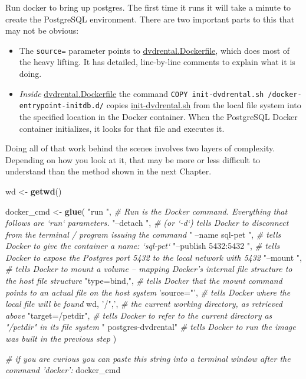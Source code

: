 \documentclass[]{book}
\newenvironment{Shaded}{\begin{snugshade}}{\end{snugshade}}
\newcommand{\CommentTok}[1]{\textcolor[rgb]{0.56,0.35,0.01}{\textit{#1}}}
\newcommand{\KeywordTok}[1]{\textcolor[rgb]{0.13,0.29,0.53}{\textbf{#1}}}
\newcommand{\NormalTok}[1]{#1}
\newcommand{\StringTok}[1]{\textcolor[rgb]{0.31,0.60,0.02}{#1}}
\providecommand{\tightlist}{%
  \setlength{\itemsep}{0pt}\setlength{\parskip}{0pt}}
\theoremstyle{definition}
\theoremstyle{definition}
\theoremstyle{definition}
\theoremstyle{remark}
\begin{document}
Run docker to bring up postgres. The first time it runs it will take a
minute to create the PostgreSQL environment. There are two important
parts to this that may not be obvious:

\begin{itemize}
\tightlist
\item
  The \texttt{source=} parameter points to
  \href{./dvdrental.Dockerfile}{dvdrental.Dockerfile}, which does most
  of the heavy lifting. It has detailed, line-by-line comments to
  explain what it is doing.\\
\item
  \emph{Inside} \href{./dvdrental.Dockerfile}{dvdrental.Dockerfile} the
  command \texttt{COPY\ init-dvdrental.sh\ /docker-entrypoint-initdb.d/}
  copies \url{init-dvdrental.sh} from the local file system into the
  specified location in the Docker container. When the PostgreSQL Docker
  container initializes, it looks for that file and executes it.
\end{itemize}

Doing all of that work behind the scenes involves two layers of
complexity. Depending on how you look at it, that may be more or less
difficult to understand than the method shown in the next Chapter.

\begin{Shaded}
\begin{Highlighting}[]
\NormalTok{wd <-}\StringTok{ }\KeywordTok{getwd}\NormalTok{()}

\NormalTok{docker_cmd <-}\StringTok{ }\KeywordTok{glue}\NormalTok{(}
  \StringTok{"run "}\NormalTok{,      }\CommentTok{# Run is the Docker command.  Everything that follows are `run` parameters.}
  \StringTok{"--detach "}\NormalTok{, }\CommentTok{# (or `-d`) tells Docker to disconnect from the terminal / program issuing the command}
  \StringTok{" --name sql-pet "}\NormalTok{,     }\CommentTok{# tells Docker to give the container a name: `sql-pet`}
  \StringTok{"--publish 5432:5432 "}\NormalTok{, }\CommentTok{# tells Docker to expose the Postgres port 5432 to the local network with 5432}
  \StringTok{"--mount "}\NormalTok{, }\CommentTok{# tells Docker to mount a volume -- mapping Docker's internal file structure to the host file structure}
  \StringTok{"type=bind,"}\NormalTok{, }\CommentTok{# tells Docker that the mount command points to an actual file on the host system}
  \StringTok{'source="'}\NormalTok{, }\CommentTok{# tells Docker where the local file will be found}
\NormalTok{  wd, }\StringTok{'/",'}\NormalTok{, }\CommentTok{# the current working directory, as retrieved above}
  \StringTok{"target=/petdir"}\NormalTok{, }\CommentTok{# tells Docker to refer to the current directory as "/petdir" in its file system}
  \StringTok{" postgres-dvdrental"} \CommentTok{# tells Docker to run the image was built in the previous step}
\NormalTok{)}

\CommentTok{# if you are curious you can paste this string into a terminal window after the command 'docker':}
\NormalTok{docker_cmd}
\end{Highlighting}
\end{Shaded}
\end{document}
